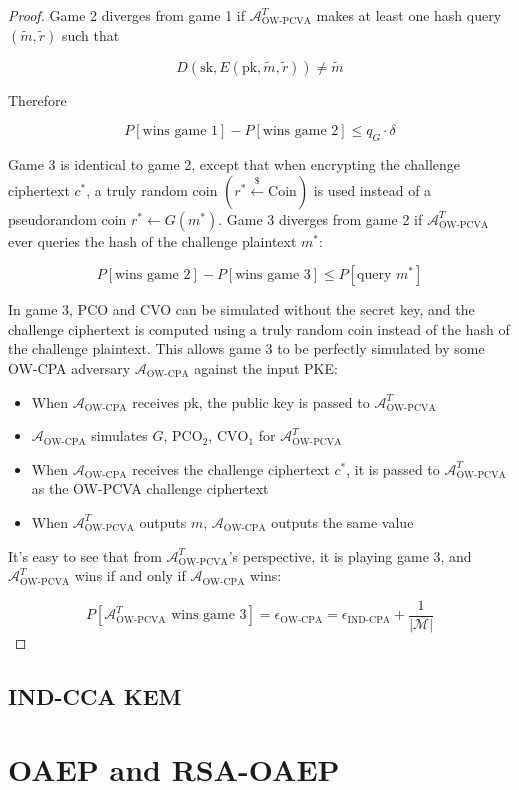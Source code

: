 \documentclass{article}
\newcommand{\leftsample}{\overset{{\scriptscriptstyle\$}}{\leftarrow}}
\begin{document}
\begin{proof}
    Game 2 diverges from game 1 if $\mathcal{A}^T_\text{OW-PCVA}$ makes at least one hash query $(\tilde{m}, \tilde{r})$ such that 
    
    $$D(\text{sk}, E(\text{pk}, \tilde{m}, \tilde{r})) \neq \tilde{m}$$

    Therefore 
    
    $$P[\text{wins game 1}] - P[\text{wins game 2}] \leq q_G \cdot \delta$$

    Game 3 is identical to game 2, except that when encrypting the challenge ciphertext $c^\ast$, a truly random coin $(r^\ast \leftsample \text{Coin})$ is used instead of a pseudorandom coin $r^\ast \leftarrow G(m^\ast)$. Game 3 diverges from game 2 if $\mathcal{A}^T_\text{OW-PCVA}$ ever queries the hash of the challenge plaintext $m^\ast$:

    $$
    P[\text{wins game 2}] - P[\text{wins game 3}] \leq P[\text{query $m^\ast$}]
    $$

    In game 3, PCO and CVO can be simulated without the secret key, and the challenge ciphertext is computed using a truly random coin instead of the hash of the challenge plaintext. This allows game 3 to be perfectly simulated by some OW-CPA adversary $\mathcal{A}_\text{OW-CPA}$ against the input PKE:

    \begin{itemize}
        \item When $\mathcal{A}_\text{OW-CPA}$ receives $\text{pk}$, the public key is passed to $\mathcal{A}^T_\text{OW-PCVA}$
        \item $\mathcal{A}_\text{OW-CPA}$ simulates $G$, $\text{PCO}_2$, $\text{CVO}_1$ for $\mathcal{A}^T_\text{OW-PCVA}$
        \item When $\mathcal{A}_\text{OW-CPA}$ receives the challenge ciphertext $c^\ast$, it is passed to $\mathcal{A}^T_\text{OW-PCVA}$ as the OW-PCVA challenge ciphertext
        \item When $\mathcal{A}^T_\text{OW-PCVA}$ outputs $m$, $\mathcal{A}_\text{OW-CPA}$ outputs the same value
    \end{itemize}

    It's easy to see that from $\mathcal{A}^T_\text{OW-PCVA}$'s perspective, it is playing game 3, and $\mathcal{A}^T_\text{OW-PCVA}$ wins if and only if $\mathcal{A}_\text{OW-CPA}$ wins:

    $$
    P[\text{$\mathcal{A}^T_\text{OW-PCVA}$ wins game 3}] = \epsilon_\text{OW-CPA} = \epsilon_\text{IND-CPA} + \frac{1}{\vert\mathcal{M}\vert}
    $$


\end{proof}

\subsection{IND-CCA KEM}

\section{OAEP and RSA-OAEP}



\end{document}
